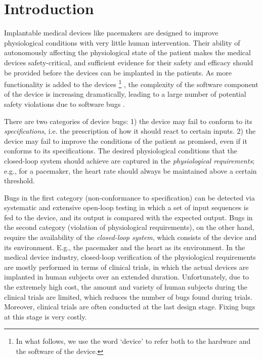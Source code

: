 \section{Introduction}
\label{introduction}

Implantable medical devices like pacemakers are designed to improve physiological conditions with very little human intervention. 
Their ability of autonomously affecting the physiological state of the patient makes the medical devices safety-critical, and sufficient evidence for their safety and efficacy should be provided before the devices can be implanted in the patients. 
As more functionality is added to the devices
\footnote{In what follows, we use the word `device' to refer both to the hardware and the software of the device.}
, the complexity of the software component of the device is increasing dramatically, leading to a large number of potential safety violations due to software bugs \cite{recall_stats}.


There are two categories of device bugs: 
1) the device may fail to conform to its \emph{specifications}, i.e. the prescription of how it should react to certain inputs.  
2) the device may fail to improve the conditions of the patient as promised, even if it conforms to its specifications. 
The desired physiological conditions that the closed-loop system should achieve are captured in the \emph{physiological requirements}; e.g., for a pacemaker, the heart rate should always be maintained above a certain threshold. 

Bugs in the first category (non-conformance to specification) can be detected via systematic and extensive open-loop testing in which a set of input sequences is fed to the device, and its output is compared with the expected output.
Bugs in the second category (violation of physiological requirements), on the other hand, require the availability of the \emph{closed-loop system}, which consists of the device and its environment.
E.g., the pacemaker and the heart as its environment. 
In the medical device industry, closed-loop verification of the physiological requirements are mostly performed in terms of clinical trials, in which the actual devices are implanted in human subjects over an extended duration.
Unfortunately, due to the extremely high cost, the amount and variety of human subjects during the clinical trials are limited, which reduces the number of bugs found during trials. 
Moreover, clinical trials are often conducted at the last design stage. Fixing bugs at this stage is very costly.

